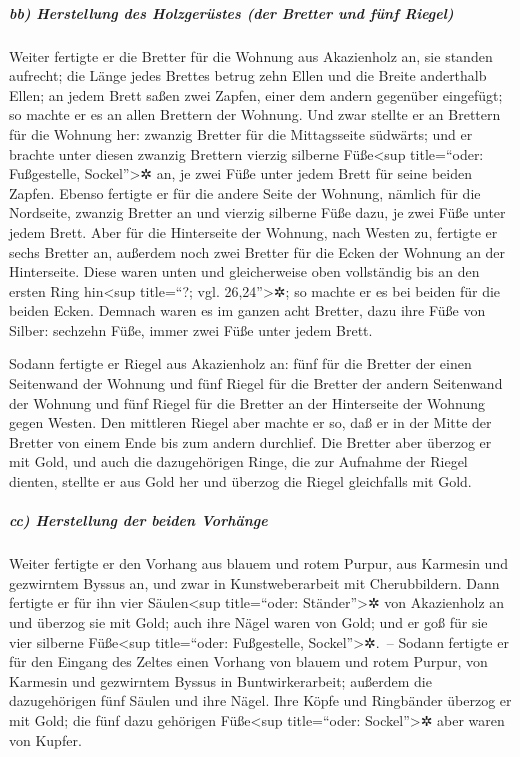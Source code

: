 \hypertarget{bb-herstellung-des-holzgeruxfcstes-der-bretter-und-fuxfcnf-riegel}{%
\subparagraph{bb) Herstellung des Holzgerüstes (der Bretter und fünf
Riegel)}\label{bb-herstellung-des-holzgeruxfcstes-der-bretter-und-fuxfcnf-riegel}}

 Weiter fertigte er die Bretter für die Wohnung aus
Akazienholz an, sie standen aufrecht;  die Länge jedes
Brettes betrug zehn Ellen und die Breite anderthalb Ellen;
 an jedem Brett saßen zwei Zapfen, einer dem andern
gegenüber eingefügt; so machte er es an allen Brettern der Wohnung.
 Und zwar stellte er an Brettern für die Wohnung her:
zwanzig Bretter für die Mittagsseite südwärts;  und er
brachte unter diesen zwanzig Brettern vierzig silberne Füße\textless sup
title=``oder: Fußgestelle, Sockel''\textgreater✲ an, je zwei Füße unter
jedem Brett für seine beiden Zapfen.  Ebenso fertigte er
für die andere Seite der Wohnung, nämlich für die Nordseite, zwanzig
Bretter an  und vierzig silberne Füße dazu, je zwei Füße
unter jedem Brett.  Aber für die Hinterseite der Wohnung,
nach Westen zu, fertigte er sechs Bretter an,  außerdem
noch zwei Bretter für die Ecken der Wohnung an der Hinterseite.
 Diese waren unten und gleicherweise oben vollständig bis
an den ersten Ring hin\textless sup title=``?; vgl.
26,24''\textgreater✲; so machte er es bei beiden für die beiden Ecken.
 Demnach waren es im ganzen acht Bretter, dazu ihre Füße
von Silber: sechzehn Füße, immer zwei Füße unter jedem Brett.

 Sodann fertigte er Riegel aus Akazienholz an: fünf für
die Bretter der einen Seitenwand der Wohnung  und fünf
Riegel für die Bretter der andern Seitenwand der Wohnung und fünf Riegel
für die Bretter an der Hinterseite der Wohnung gegen Westen.
 Den mittleren Riegel aber machte er so, daß er in der
Mitte der Bretter von einem Ende bis zum andern durchlief.
 Die Bretter aber überzog er mit Gold, und auch die
dazugehörigen Ringe, die zur Aufnahme der Riegel dienten, stellte er aus
Gold her und überzog die Riegel gleichfalls mit Gold.

\hypertarget{cc-herstellung-der-beiden-vorhuxe4nge}{%
\subparagraph{cc) Herstellung der beiden
Vorhänge}\label{cc-herstellung-der-beiden-vorhuxe4nge}}

 Weiter fertigte er den Vorhang aus blauem und rotem
Purpur, aus Karmesin und gezwirntem Byssus an, und zwar in
Kunstweberarbeit mit Cherubbildern.  Dann fertigte er für
ihn vier Säulen\textless sup title=``oder: Ständer''\textgreater✲ von
Akazienholz an und überzog sie mit Gold; auch ihre Nägel waren von Gold;
und er goß für sie vier silberne Füße\textless sup title=``oder:
Fußgestelle, Sockel''\textgreater✲.~--  Sodann fertigte
er für den Eingang des Zeltes einen Vorhang von blauem und rotem Purpur,
von Karmesin und gezwirntem Byssus in Buntwirkerarbeit; 
außerdem die dazugehörigen fünf Säulen und ihre Nägel. Ihre Köpfe und
Ringbänder überzog er mit Gold; die fünf dazu gehörigen
Füße\textless sup title=``oder: Sockel''\textgreater✲ aber waren von
Kupfer.

